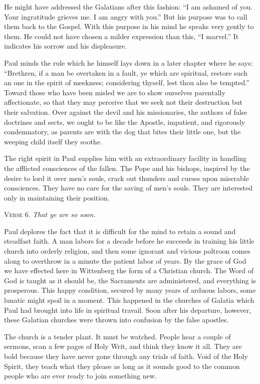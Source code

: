 He might have addressed the Galatians after this fashion: “I am ashamed of you. Your ingratitude grieves me. I am angry with you.” But his purpose was to call them back to the Gospel. With this purpose in his mind he speaks very gently to them. He could not have chosen a milder expression than this, “I marvel.” It indicates his sorrow and his displeasure.

Paul minds the rule which he himself lays down in a later chapter where he says: “Brethren, if a man be overtaken in a fault, ye which are spiritual, restore such an one in the spirit of meekness; considering thyself, lest thou also be tempted.” Toward those who have been misled we are to show ourselves parentally affectionate, so that they may perceive that we seek not their destruction but their salvation. Over against the devil and his missionaries, the authors of false doctrines and sects, we ought to be like the Apostle, impatient, and rigorously condemnatory, as parents are with the dog that bites their little one, but the weeping child itself they soothe.

The right spirit in Paul supplies him with an extraordinary facility in handling the afflicted consciences of the fallen. The Pope and his bishops, inspired by the desire to lord it over men’s souls, crack out thunders and curses upon miserable consciences. They have no care for the saving of men’s souls. They are interested only in maintaining their position.

\textsc{Verse} 6. \emph{That ye are so soon.}

Paul deplores the fact that it is difficult for the mind to retain a sound and steadfast faith. A man labors for a decade before he succeeds in training his little church into orderly religion, and then some ignorant and vicious poltroon comes along to overthrow in a minute the patient labor of years. By the grace of God we have effected here in Wittenberg the form of a Christian church. The Word of God is taught as it should be, the Sacraments are administered, and everything is prosperous. This happy condition, secured by many years of arduous labors, some lunatic might spoil in a moment. This happened in the churches of Galatia which Paul had brought into life in spiritual travail. Soon after his departure, however, these Galatian churches were thrown into confusion by the false apostles.

The church is a tender plant. It must be watched. People hear a couple of sermons, scan a few pages of Holy Writ, and think they know it all. They are bold because they have never gone through any trials of faith. Void of the Holy Spirit, they teach what they please as long as it sounds good to the common people who are ever ready to join something new.

